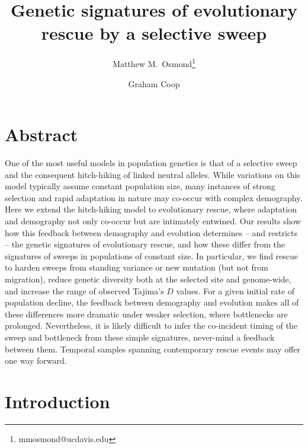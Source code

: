 \documentclass[]{article}
\title{Genetic signatures of evolutionary rescue by a selective sweep}
\author[*]{Matthew M.\ Osmond\thanks{mmosmond@ucdavis.edu}}
\author[*]{Graham Coop}
\affil[*]{Center for Population Biology and Department of Evolution and Ecology, University of California, Davis, California 95616}
\date{}
\begin{document}

\maketitle

\section*{Abstract}
\label{sec:abstract}

One of the most useful models in population genetics is that of a selective sweep and the consequent hitch-hiking of linked neutral alleles.
While variations on this model typically assume constant population size, many instances of strong selection and rapid adaptation in nature may co-occur with complex demography.
Here we extend the hitch-hiking model to evolutionary rescue, where adaptation and demography not only co-occur but are intimately entwined. 
Our results show how this feedback between demography and evolution determines -- and restricts -- the genetic signatures of evolutionary rescue, and how these differ from the signatures of sweeps in populations of constant size.
In particular, we find rescue to harden sweeps from standing variance or new mutation (but not from migration), reduce genetic diversity both at the selected site and genome-wide, and increase the range of observed Tajima's $D$ values.
For a given initial rate of population decline, the feedback between demography and evolution makes all of these differences more dramatic under weaker selection, where bottlenecks are prolonged. 
Nevertheless, it is likely difficult to infer the co-incident timing of the sweep and bottleneck from these simple signatures, never-mind a feedback between them. 
Temporal samples spanning contemporary rescue events may offer one way forward.

\section*{Introduction}
\label{sec:intro}
\end{document}
